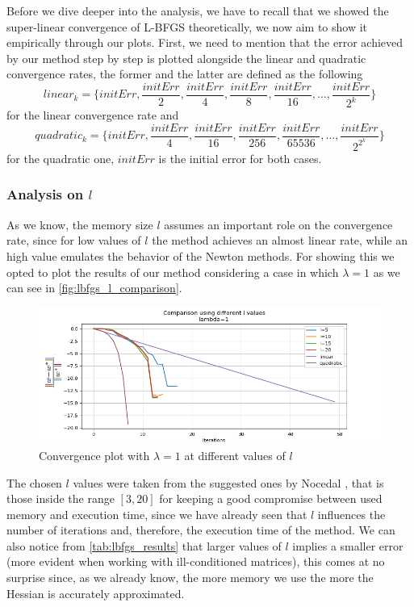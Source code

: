 \noindent Before we dive deeper into the analysis, we have to recall that we showed the super-linear convergence of L-BFGS theoretically, we now aim to show it empirically through our plots. First, we need to mention that the error achieved by our method step by step is plotted alongside the linear and quadratic convergence rates, the former and the latter are defined as the following
\begin{equation}
    linear_k = \{ initErr,\frac{initErr}{2}, \frac{initErr}{4},\frac{initErr}{8},\frac{initErr}{16},\dots,\frac{initErr}{2^k} \}
\end{equation}
for the linear convergence rate and
\begin{equation}
    quadratic_k = \{ initErr, \frac{initErr}{4}, \frac{initErr}{16},\frac{initErr}{256},\frac{initErr}{65536},\dots,\frac{initErr}{2^{2^k}} \}
\end{equation}
for the quadratic one, $initErr$ is the initial error for both cases.

\subsubsection{Analysis on \texorpdfstring{$l$}{{}}} \label{subsubsec:lbfgs_l_analysis}
As we know, the memory size $l$ assumes an important role on the convergence rate, since for low values of $l$ the method achieves an almost linear rate, while an high value emulates the behavior of the Newton methods. For showing this we opted to plot the results of our method considering a case in which $\lambda=1$ as we can see in \autoref{fig:lbfgs_l_comparison}.
\begin{figure}[H]
    \centering
    \includegraphics[width=0.8\linewidth]{images/lbfgs/lambda1.png}
    \caption{Convergence plot with $\lambda=1$ at different values of $l$}
    \label{fig:lbfgs_l_comparison}
\end{figure}

\noindent The chosen $l$ values were taken from the suggested ones by Nocedal \cite{nocedal1999numerical}, that is those inside the range $[3, 20]$ for keeping a good compromise between used memory and execution time, since we have already seen that $l$ influences the number of iterations and, therefore, the execution time of the method. We can also notice from \autoref{tab:lbfgs_results} that larger values of $l$ implies a smaller error (more evident when working with ill-conditioned matrices), this comes at no surprise since, as we already know, the more memory we use the more the Hessian is accurately approximated.
\vspace{3mm}

